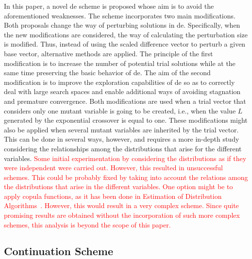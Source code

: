 \documentclass[review,3p]{elsarticle}
\newcommand{\DE}{{\sc de}}
\begin{document}
In this paper, a novel \DE{} scheme is proposed whose aim is to avoid the aforementioned weaknesses.
%
The scheme incorporates two main modifications.
%
Both proposals change the way of perturbing solutions in \DE{}.
%
Specifically, when the new modifications are considered, the way of calculating the perturbation size is modified.
%
Thus, instead of using the scaled difference vector to perturb a given base vector, alternative
methods are applied.
%
The principle of the first modification is to increase the number of potential trial solutions while at the same
time preserving the basic behavior of \DE{}.
%
The aim of the second modification is to improve the exploration capabilities of \DE{} so as to
correctly deal with large search spaces and enable additional ways of avoiding stagnation
and premature convergence.
%
Both modifications are used when a trial vector that considers only one mutant variable
is going to be created, i.e., when the value $L$ generated by the exponential crossover is equal to one.
%
%
These modifications might also be applied when several mutant variables are inherited by the trial vector.
%
This can be done in several ways, however, and requires a more in-depth study considering the relationships
among the distributions that arise for the different variables.
%
\textcolor{red}{
Some initial experimentation by considering the distributions as if they were independent were carried out.
%
However, this resulted in unsuccessful schemes.
%
This could be probably fixed by taking into account the relations among the distributions that arise in the different variables.
%
One option might be to apply copula functions, as it has been done in Estimation of Distribution Algorithms~\cite{Rogelio:09}.
%
However, this would result in a very complex scheme.
%
Since quite promising results are obtained without the incorporation of such more complex schemes, 
this analysis is beyond the scope of this paper.
}

\subsection{Continuation Scheme}
\end{document}
